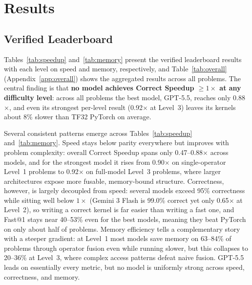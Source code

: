 \documentclass[]{fairmeta}
\begin{document}

\section{Results}
\label{sec:results}

\subsection{Verified Leaderboard}

Tables~\ref{tab:speedup} and~\ref{tab:memory} present the verified leaderboard results with each level on speed and memory, respectively, and Table~\ref{tab:overall} (Appendix~\ref{app:overall}) shows the aggregated results across all problems. The central finding is that \textbf{no model achieves Correct Speedup $\geq 1\times$ at any difficulty level}: across all problems the best model, GPT-5.5, reaches only 0.88$\times$, and even its strongest per-level result (0.92$\times$ at Level~3) leaves its kernels about 8\% slower than TF32 PyTorch on average.

Several consistent patterns emerge across Tables~\ref{tab:speedup} and~\ref{tab:memory}. Speed stays below parity everywhere but improves with problem complexity: overall Correct Speedup spans only 0.47--0.88$\times$ across models, and for the strongest model it rises from 0.90$\times$ on single-operator Level~1 problems to 0.92$\times$ on full-model Level~3 problems, where larger architectures expose more fusable, memory-bound structure. Correctness, however, is largely decoupled from speed: several models exceed 95\% correctness while sitting well below $1\times$ (Gemini 3 Flash is 99.0\% correct yet only 0.65$\times$ at Level~2), so writing a correct kernel is far easier than writing a fast one, and Fast@1 stays near 40--53\% even for the best models, meaning they beat PyTorch on only about half of problems. Memory efficiency tells a complementary story with a steeper gradient: at Level~1 most models save memory on 63--84\% of problems through operator fusion even while running slower, but this collapses to 20--36\% at Level~3, where complex access patterns defeat naive fusion. GPT-5.5 leads on essentially every metric, but no model is uniformly strong across speed, correctness, and memory.
\end{document}
